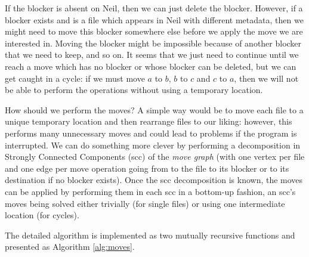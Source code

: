 \documentclass{llncs}
\begin{document}
If the blocker is absent on Neil, then we can just delete the blocker. However, if a blocker exists and is a file which appears in Neil with different metadata, then we might need to move this blocker somewhere else before we apply the move we are interested in. Moving the blocker might be impossible because of another blocker that we need to keep, and so on. It seems that we just need to continue until we reach a move which has no blocker or whose blocker can be deleted, but we can get caught in a cycle: if we must move $a$ to $b$, $b$ to $c$ and $c$ to $a$, then we will not be able to perform the operations without using a temporary location.

How should we perform the moves? A simple way would be to move each file to a unique temporary location and then rearrange files to our liking: however, this performs many unnecessary moves and could lead to problems if the program is interrupted. We can do something more clever by performing a decomposition in Strongly Connected Components ({\sc scc}) of the \textit{move graph} (with one vertex per file and one edge per move operation going from to the file to its blocker or to its destination if no blocker exists).
Once the {\sc scc} decomposition is known, the moves can be applied by performing them in each {\sc scc} in a bottom-up fashion, an {\sc scc}'s moves being solved either trivially (for single files) or using one intermediate location (for cycles).

The detailed algorithm is implemented as two mutually recursive functions and presented as Algorithm \ref{alg:moves}.
\end{document}

